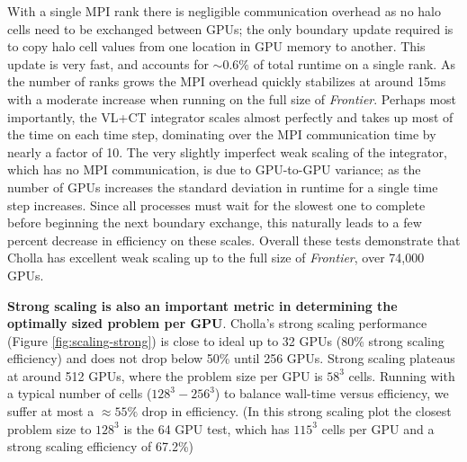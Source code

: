 \documentclass[modern, linenumbers]{aastex631}
\begin{document}
With a single MPI rank there is negligible communication overhead as no halo cells need to be exchanged between GPUs; the only boundary update required is to copy halo cell values from one location in GPU memory to another. This update is very fast, and accounts for $\sim 0.6\%$ of total runtime on a single rank. As the number of ranks grows the MPI overhead quickly stabilizes at around 15ms with a moderate increase when running on the full size of \textit{Frontier}. Perhaps most importantly, the VL+CT integrator scales almost perfectly and takes up most of the time on each time step, dominating over the MPI communication time by nearly a factor of 10. The very slightly imperfect weak scaling of the integrator, which has no MPI communication, is due to GPU-to-GPU variance; as the number of GPUs increases the standard deviation in runtime for a single time step increases. Since all processes must wait for the slowest one to complete before beginning the next boundary exchange, this naturally leads to a few percent decrease in efficiency on these scales. Overall these tests demonstrate that Cholla has excellent weak scaling up to the full size of \textit{Frontier}, over 74,000 GPUs.

\textbf{Strong scaling is also an important metric in determining the optimally sized problem per GPU}. Cholla's strong scaling performance (Figure \ref{fig:scaling-strong}) is close to ideal up to 32 GPUs (80\% strong scaling efficiency) and does not drop below 50\% until 256 GPUs. Strong scaling plateaus at around 512 GPUs, where the problem size per GPU is $58^3$ cells. Running with a typical number of cells ($128^3 - 256^3$) to balance wall-time versus efficiency, we suffer at most a $\approx55\%$ drop in efficiency. (In this strong scaling plot the closest problem size to $128^3$ is the 64 GPU test, which has $115^3$ cells per GPU and a strong scaling efficiency of 67.2\%)

\end{document}
